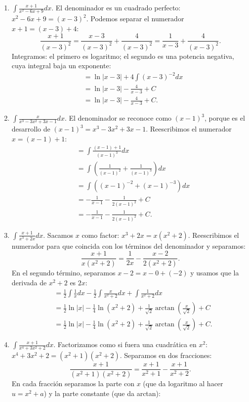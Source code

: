 \documentclass[12pt, letterpaper]{article}
\makeatletter
\renewcommand{\alph}[1]{\expandafter\@alphlatin\csname c@#1\endcsname}
\newcommand{\@alphlatin}[1]{\ifcase#1\or a\or b\or c\or d\or e\or f\or g\or h\or i\or j\or k\or l\or m\or n\or o\or p\or q\or r\or s\or t\or u\or v\or w\or x\or y\or z\else\@ctrerr\fi}
\makeatother
\begin{document}
\begin{enumerate}[label=\alph*)]
\[  \]
  \item $\displaystyle\int\frac{x+1}{x^2-6x+9}dx$. El denominador es un cuadrado perfecto: $x^2-6x+9=(x-3)^2$. Podemos separar el numerador $x+1=(x-3)+4$:
  \[
  \frac{x+1}{(x-3)^2}=\frac{x-3}{(x-3)^2}+\frac4{(x-3)^2}=\frac1{x-3}+\frac4{(x-3)^2}.
  \]
  Integramos: el primero es logaritmo; el segundo es una potencia negativa, cuya integral baja un exponente:
  \[
  \begin{aligned}
  &=\ln|x-3|+4\int(x-3)^{-2}dx\\
  &=\ln|x-3|-\frac4{x-3}+C\\
  &=\boxed{\ln|x-3|-\frac4{x-3}+C}.
  \end{aligned}
  \]
  \item $\displaystyle\int\frac{x}{x^3-3x^2+3x-1}dx$. El denominador se reconoce como $(x-1)^3$, porque es el desarrollo de $(x-1)^3=x^3-3x^2+3x-1$. Reescribimos el numerador $x=(x-1)+1$:
  \[
  \begin{aligned}
  &=\int\frac{(x-1)+1}{(x-1)^3}dx\\
  &=\int\left(\frac1{(x-1)^2}+\frac1{(x-1)^3}\right)dx\\
  &=\int((x-1)^{-2}+(x-1)^{-3})dx\\
  &=-\frac1{x-1}-\frac1{2(x-1)^2}+C\\
  &=\boxed{-\frac1{x-1}-\frac1{2(x-1)^2}+C}.
  \end{aligned}
  \]
  \item $\displaystyle\int\frac{x+1}{x^3+2x}dx$. Sacamos $x$ como factor: $x^3+2x=x(x^2+2)$. Reescribimos el numerador para que coincida con los términos del denominador y separamos:
  \[
  \frac{x+1}{x(x^2+2)}=\frac1{2x}-\frac{x-2}{2(x^2+2)}.
  \]
  En el segundo término, separamos $x-2=x-0+(-2)$ y usamos que la derivada de $x^2+2$ es $2x$:
  \[
  \begin{aligned}
  &=\frac12\int\frac1x dx-\frac12\int\frac{x}{x^2+2}dx+\int\frac1{x^2+2}dx\\
  &=\frac12\ln|x|-\frac14\ln(x^2+2)+\frac1{\sqrt2}\arctan\left(\frac{x}{\sqrt2}\right)+C\\
  &=\boxed{\frac12\ln|x|-\frac14\ln(x^2+2)+\frac1{\sqrt2}\arctan\left(\frac{x}{\sqrt2}\right)+C}.
  \end{aligned}
  \]
  \item $\displaystyle\int\frac{x+1}{x^4+3x^2+2}dx$. Factorizamos como si fuera una cuadrática en $x^2$: $x^4+3x^2+2=(x^2+1)(x^2+2)$. Separamos en dos fracciones:
  \[
  \frac{x+1}{(x^2+1)(x^2+2)}=\frac{x+1}{x^2+1}-\frac{x+1}{x^2+2}.
  \]
  En cada fracción separamos la parte con $x$ (que da logaritmo al hacer $u=x^2+a$) y la parte constante (que da arctan):

\end{enumerate}
\end{document}
